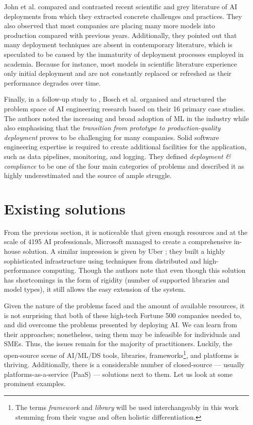 John et al. \cite{john2020architecting} compared and contrasted recent scientific and grey literature of AI deployments from which they extracted concrete challenges and practices. They also observed that most companies are placing many more models into production compared with previous years. Additionally, they pointed out that many deployment techniques are absent in contemporary literature, which is speculated to be caused by the immaturity of deployment processes employed in academia. Because for instance, most models in scientific literature experience only initial deployment and are not constantly replaced or refreshed as their performance degrades over time.

Finally, in a follow-up study to \cite{john2020architecting}, Bosch et al. \cite{bosch2021engineering} organised and structured the problem space of AI engineering research based on their 16 primary case studies. The authors noted the increasing and broad adoption of ML in the industry while also emphasising that the \textit{transition from prototype to production-quality deployment} proves to be challenging for many companies. Solid software engineering expertise is required to create additional facilities for the application, such as data pipelines, monitoring, and logging. They defined \textit{deployment \& compliance} to be one of the four main categories of problems and described it as highly underestimated and the source of ample struggle.

\section{Existing solutions} \label{section:existing}

From the previous section, it is noticeable that given enough resources and at the scale of 4195 AI professionals, Microsoft managed to create a comprehensive in-house solution. A similar impression is given by Uber \cite{li2017scaling}; they built a highly sophisticated infrastructure using techniques from distributed and high-performance computing. Though the authors note that even though this solution has shortcomings in the form of rigidity (number of supported libraries and model types), it still allows the easy extension of the system.

Given the nature of the problems faced and the amount of available resources, it is not surprising that both of these high-tech Fortune 500 companies needed to, and did overcome the problems presented by deploying AI. We can learn from their approaches; nonetheless, using them may be infeasible for individuals and SMEs. Thus, the issues remain for the majority of practitioners. Luckily, the open-source scene of AI/ML/DS tools, libraries, frameworks\footnote{The terms \textit{framework} and \textit{library} will be used interchangeably in this work stemming from their vague and often holistic differentiation.}, and platforms is thriving. Additionally, there is a considerable number of closed-source --- usually platforms-as-a-service (PaaS) --- solutions next to them. Let us look at some prominent examples.

